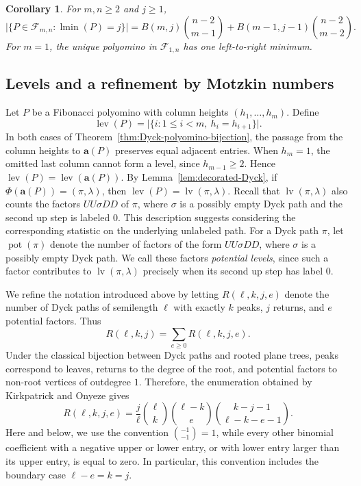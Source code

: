 \documentclass[12pt]{amsart}
\theoremstyle{plain}
\newtheorem{coro}[theorem]{Corollary}
\theoremstyle{definition}
\DeclareMathOperator{\lv}{lv}
\newcommand{\F}{{\mathcal F}}
\DeclareMathOperator{\lev}{lev}
\DeclareMathOperator{\lmin}{lmin}
\begin{document}
\begin{coro}\label{cor:minima-distribution}
For $m,n\geq2$ and $j\geq1$,
\[
\bigl|
\{P\in\F_{m,n}:\lmin(P)=j\}
\bigr|
=
B(m,j)\binom{n-2}{m-1}
+
B(m-1,j-1)\binom{n-2}{m-2}.
\]
For $m=1$, the unique polyomino in $\F_{1,n}$ has one
left-to-right minimum.
\end{coro}






\subsection{Levels and a refinement by Motzkin numbers}
\label{subsec:levels}
Let $P$ be a Fibonacci polyomino with column heights
$(h_1,\ldots,h_m)$. Define
\[
\lev(P)
=
\bigl|
\{i:1\leq i<m,\ h_i=h_{i+1}\}
\bigr|.
\]
In both cases of Theorem~\ref{thm:Dyck-polyomino-bijection}, the passage
from the column heights to $\mathbf a(P)$ preserves equal adjacent
entries. When $h_m=1$, the omitted last column cannot form a level,
since $h_{m-1}\geq2$. Hence $\lev(P)=\lev(\mathbf a(P))$.  By Lemma~\ref{lem:decorated-Dyck}, if
$\Phi(\mathbf a(P))=(\pi,\lambda)$, then
$\lev(P)=\lv(\pi,\lambda)$. Recall that $\lv(\pi,\lambda)$ also counts the factors $UU\sigma DD$ of $\pi$, where $\sigma$ is a possibly empty Dyck path and the second
up step is labeled $0$. This description suggests considering the
corresponding statistic on the underlying unlabeled path. For a Dyck path $\pi$, let $\operatorname{pot}(\pi)$ denote the number
of factors of the form $UU\sigma DD$, 
where $\sigma$ is a possibly empty Dyck path. We call these factors
\emph{potential levels}, since such a factor contributes to
$\lv(\pi,\lambda)$ precisely when its second up step has label $0$.


We refine the notation introduced above by letting $R(\ell,k,j,e)$
denote the number of Dyck paths of semilength $\ell$ with exactly $k$
peaks, $j$ returns, and $e$ potential factors. Thus
\[
R(\ell,k,j)
=
\sum_{e\geq0}R(\ell,k,j,e).
\]
Under the classical bijection between Dyck paths and rooted plane trees, peaks correspond to leaves, returns to the degree of the root, and
potential factors to non-root vertices of outdegree $1$. Therefore, the
enumeration obtained by Kirkpatrick and Onyeze
\cite[Theorem~4.1.4]{KirkpatrickOnyeze} gives
\[
R(\ell,k,j,e)
=
\frac{j}{\ell}
\binom{\ell}{k}
\binom{\ell-k}{e}
\binom{k-j-1}{\ell-k-e-1}.
\]
Here and below, we use the convention $\binom{-1}{-1}=1$,  while every other binomial coefficient with a negative upper or lower
entry, or with lower entry larger than its upper entry, is equal to
zero. In particular, this convention includes the boundary case $\ell-e=k=j$.
\end{document}
